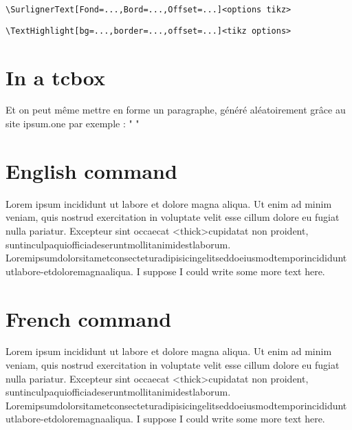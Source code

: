 \documentclass[french]{article}
\begin{document}
\verb|\SurlignerText[Fond=...,Bord=...,Offset=...]<options tikz>|

\verb|\TextHighlight[bg=...,border=...,offset=...]<tikz options>|

\medskip

\section{In a tcbox}

\begin{tcolorbox}[colframe=lightgray,colback=lightgray!5]
Et on peut même mettre en forme un paragraphe, généré aléatoirement grâce au site ipsum.one par exemple : "  "
\end{tcolorbox}

\section{English command}

Lorem ipsum {\Huge{}} incididunt ut labore et dolore magna aliqua. Ut enim ad minim
veniam, quis nostrud exercitation  in
voluptate velit esse cillum dolore eu fugiat nulla pariatur.  Excepteur sint
occaecat \TextHighlight[bg=green,border=blue]<thick>{cupidatat non proident,
suntinculpaquiofficiadeseruntmollitanimidestlaborum.
Loremipsumdolorsitametconsecteturadipisicingelitseddoeiusmodtemporincididuntutlabore-etdoloremagnaaliqua.}
I suppose I could write some more text here.

\bigskip

\section{French command}

Lorem ipsum {\Huge{}} incididunt ut labore et dolore magna aliqua. Ut enim ad minim
veniam, quis nostrud exercitation  in
voluptate velit esse cillum dolore eu fugiat nulla pariatur.  Excepteur sint
occaecat \SurlignerTexte[Fond=orange,Bord=teal]<thick>{cupidatat non proident,
suntinculpaquiofficiadeseruntmollitanimidestlaborum.
Loremipsumdolorsitametconsecteturadipisicingelitseddoeiusmodtemporincididuntutlabore-etdoloremagnaaliqua.}
I suppose I could write some more text here.
\end{document}
